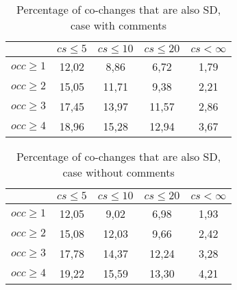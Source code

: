 \begin{table}[!h]
\renewcommand{\arraystretch}{1}
\caption{Percentage of co-changes that are also SD, case with comments}
\label{tab:percLD:comm}
\centering

\begin{tabular}{|c|c|c|c|c|}
\hline
	      &	$cs\leq 5$	&	$cs\leq 10$	&	$cs\leq 20$	&	$cs< \infty$	\\
\hline
$occ\geq 1$	&	12,02	&	8,86	&	6,72	&	1,79	\\
$occ\geq 2$	&	15,05	&	11,71	&	9,38	&	2,21	\\
$occ\geq 3$	&	17,45	&	13,97	&	11,57	&	2,86	\\
$occ\geq 4$	&	18,96	&	15,28	&	12,94	&	3,67	\\
\hline
\end{tabular}
\end{table}

\begin{table}[!h]
\renewcommand{\arraystretch}{1}
\caption{Percentage of co-changes that are also SD, case without comments}
\label{tab:percLD:nocomm}
\centering
\begin{tabular}{|c|c|c|c|c|}
\hline
	      &	$cs\leq 5$	&	$cs\leq 10$	&	$cs\leq 20$	&	$cs< \infty$	\\
\hline
$occ\geq 1$	&	12,05	&	9,02	&	6,98	&	1,93	\\
$occ\geq 2$	&	15,08	&	12,03	&	9,66	&	2,42	\\
$occ\geq 3$	&	17,78	&	14,37	&	12,24	&	3,28	\\
$occ\geq 4$	&	19,22	&	15,59	&	13,30	&	4,21	\\
\hline
\end{tabular}
\end{table}



\begin{table}[!h]
\renewcommand{\arraystretch}{1}
\caption{Percentage of SD that are also co-changing pairs after connection strength filtering. }
\label{tab:percSDstrength}
\centering
{}
\end{table}

